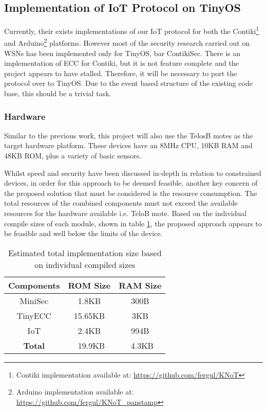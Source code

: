 \documentclass{mprop}
\begin{document}
\subsection{Implementation of IoT Protocol on TinyOS} %
\label{sub:implementation_of_iot_protocol_on_tinyos}
Currently, their exists implementations of our IoT protocol for both the Contiki\footnote{Contiki implementation available at: \url{https://github.com/fergul/KNoT}} and Arduino\footnote{Arduino implementation available at: \url{https://github.com/fergul/KNoT_panstamp}} platforms. However most of the security research carried out on WSNs has been implemented only for TinyOS, bar ContikiSec. There is an implementation of ECC for Contiki, but it is not feature complete and the project appears to have stalled\cite{ContikiECC}. Therefore, it will be necessary to port the protocol over to TinyOS. Due to the event based structure of the existing code base, this should be a trivial task.

\subsubsection{Hardware} %
\label{ssub:hardware}
Similar to the previous work\cite{KNoT}, this project will also use the TelosB motes as the target hardware platform. These devices have an 8MHz CPU, 10KB RAM and 48KB ROM, plus a variety of basic sensors.

Whilst speed and security have been discussed in-depth in relation to constrained devices, in order for this approach to be deemed feasible, another key concern of the proposed solution that must be considered is the resource consumption. The total resources of the combined components must not exceed the available resources for the hardware available i.e. TeloB mote. Based on the individual compile sizes of each module, shown in table \ref{tab:compile_sizes}, the proposed approach appears to be feasible and well below the limits of the device.
\begin{table}[h] %
  \begin{center} 
  \begin{tabular}{|c|c|c|} 
  \hline
  \textbf{Components} & \textbf{ROM Size}  & \textbf{RAM Size}\\  \hline
  MiniSec             & 1.8KB              & 300B \\     \hline
  TinyECC             & 15.65KB            & 3KB\\       \hline
  IoT                 & 2.4KB              & 994B\\      \hline 
  \textbf{Total}      & ~19.9KB            & ~4.3KB\\    \hline
  \end{tabular}
  \caption[]{Estimated total implementation size based on individual compiled sizes}
  \label{tab:compile_sizes}
  \end{center}
\end{table}
\end{document}
